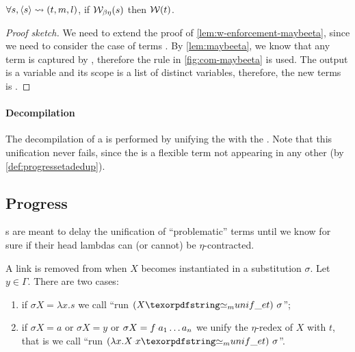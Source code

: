 \begin{lemma}\label{lem:w-enforcement-maybeeta}
  $\forall s, \langle s \rangle\rightsquigarrow(t,m,l)$, if $\mathcal{W}_{\beta \eta}(s)$  then $\mathcal{W}(t)$.
\end{lemma}

\begin{proof}[Proof sketch]
  We need to extend the proof of \cref{lem:w-enforcement-maybeeta}, since we
  need to consider the case of terms \maybeeta. By \cref{lem:maybeeta},
  we know that any \maybeeta term is captured by \testmaybeeta, therefore
  the rule in \cref{fig:com-maybeeta} is used. The output is a variable and
  its scope is a list of distinct variables, 
  therefore, the new terms is \wellb.
\end{proof}


\paragraph*{Decompilation}
The decompilation of a \linketa is performed by unifying
the \lhs with the \rhs. Note that this unification never fails, since the \lhs is a
flexible term not appearing in any other \linketa
(by \cref{def:progressetadedup}).

\subsection{Progress}\label{sec:etaprogress}

\linketa{}s are meant to delay the unification of ``problematic'' terms until
we know for sure if their head lambdas can (or cannot) be $\eta$-contracted.

\newcommand{\progressetaleft}{\emph{\texorpdfstring{$\eta$}{eta}-progress-\lhs}\xspace}

\begin{definition}[\progressetaleft]\label{def:progressetaleft}
A link  is removed from \linkStore when
  $X$ becomes instantiated in a substitution $\sigma$. Let $y\in\Gamma$. There are two cases:
\begin{enumerate}
  \item if $\sigma X = \lambda x.s$ we call ``run $(X \Ue{} t)\ \sigma$'';
  \item if $\sigma X = a$ or $\sigma X = y$ or $\sigma X = f \appsep a_1\ldots a_n$
    we unify the $\eta$-redex of $X$ with $t$, that is we call ``run
    $(\lambda x.X \appsep x\Ue{} t)\ \sigma$''.
\end{enumerate}
\end{definition}

